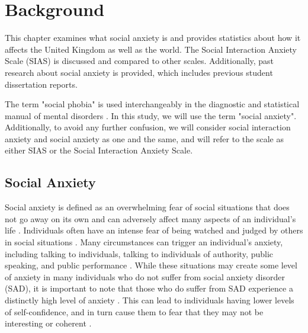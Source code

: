 \documentclass{l4proj}
\begin{document}
\chapter{Background} \label{Background}
This chapter examines what social anxiety is and provides statistics about how it affects the United Kingdom as well as the world. The Social Interaction Anxiety Scale (SIAS) is discussed and compared to other scales. Additionally, past research about social anxiety is provided, which includes previous student dissertation reports.

The term "social phobia" is used interchangeably in the diagnostic and statistical manual of mental disorders \citep{dsm_5}. In this study, we will use the term "social anxiety". Additionally, to avoid any further confusion, we will consider social interaction anxiety and social anxiety as one and the same, and will refer to the scale as either SIAS or the Social Interaction Anxiety Scale.

\section{Social Anxiety}
Social anxiety is defined as an overwhelming fear of social situations that does not go away on its own and can adversely affect many aspects of an individual's life \citep{nhs}. Individuals often have an intense fear of being watched and judged by others in social situations \citep{nimh}. Many circumstances can trigger an individual's anxiety, including talking to individuals, talking to individuals of authority, public speaking, and public performance \citep{anxiety_cause}. While these situations may create some level of anxiety in many individuals who do not suffer from social anxiety disorder (SAD), it is important to note that those who do suffer from SAD experience a distinctly high level of anxiety \citep{anxiety_cause}. This can lead to individuals having lower levels of self-confidence, and in turn cause them to fear that they may not be interesting or coherent \citep{sias_origin}.
\end{document}
